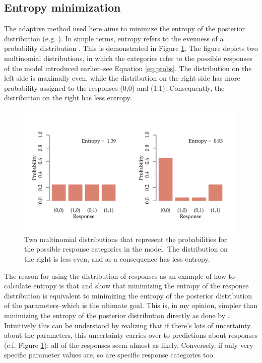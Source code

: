 \documentclass{article}\usepackage{knitr}
\begin{document}
\subsection{Entropy minimization}

The adaptive method used here aims to minimize the entropy of the posterior distribution (e.g. \citet{kontsevichtyler1999, kujalalukka2006, lesmes2015}). In simple terms, entropy refers to the evenness of a probability distribution \citep[p. 365]{kruschke2015}. This is demonstrated in Figure \ref{fig:entropy}. The figure depicts two multinomial distributions, in which the categories refer to the possible responses of the model introduced earlier--see Equation \ref{eq:probs}. The distribution on the left side is maximally even, while the distribution on the right side has more probability assigned to the responses (0,0) and (1,1). Consequently, the distribution on the right has less entropy.

\begin{figure}
\begin{center}
\begin{knitrout}
\color{fgcolor}
\includegraphics[width=\maxwidth]{figure/unnamed-chunk-14-1} 

\end{knitrout}
\end{center}
\caption{Two multinomial distributions that represent the probabilities for the possible response categories in the model. The distribution on the right is less even, and as a consequence has less entropy.}
\label{fig:entropy}
\end{figure}

The reason for using the distribution of responses as an example of how to calculate entropy is that \citet{kujalalukka2006} and \citet{kujala2011} show that minimizing the entropy of the response distribution is equivalent to minimizing the entropy of the posterior distribution of the parameters--which is the ultimate goal. This is, in my opinion, simpler than minimizing the entropy of the posterior distribution directly as done by \citet{kontsevichtyler1999}. Intuitively this can be understood by realizing that if there's lots of uncertainty about the parameters, this uncertainty carries over to predictions about responses (c.f. Figure \ref{fig:entropy}): all of the responses seem almost as likely. Conversely, if only very specific parameter values are, so are specific response categories too. 
\end{document}
